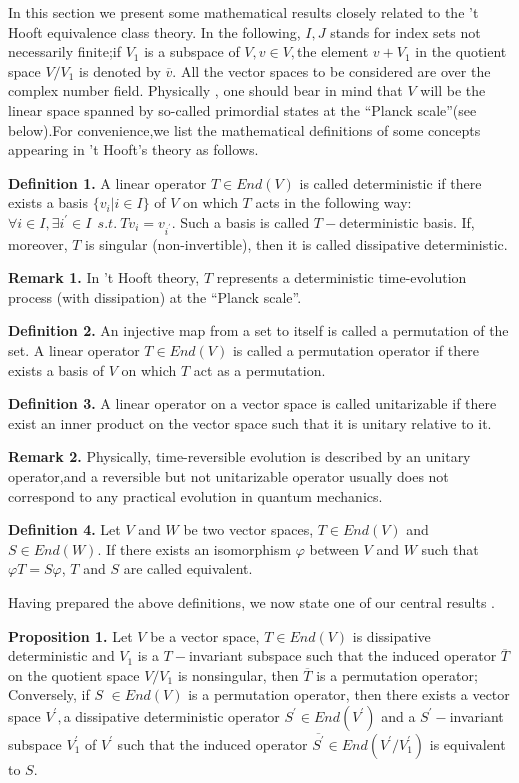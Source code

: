 \documentclass[a4paper,12pt]{article}
\begin{document}
In this section we present some mathematical results closely related to the
't Hooft equivalence class theory. In the following, $I,J$ stands for index
sets not necessarily finite;if $V_1$ is a subspace of $V,v\in V,$the element
$v+V_1$ in the quotient space $V/V_1$ is denoted by $\overline{v}.$ All the
vector spaces to be considered are over the complex number field. Physically
, one should bear in mind that $V$ will be the linear space spanned by
so-called primordial states at the ``Planck scale''(see below).For
convenience,we list the mathematical definitions of some concepts appearing
in 't Hooft's theory as follows.

\textbf{Definition 1.} A linear operator $T\in End(V)$ is called
deterministic if there exists a basis $\{v_i|i\in I\}$ of $V$ on which $T$
acts in the following way:$\forall i\in I,\exists i^{\prime }\in I\ \ s.t.\
Tv_i=v_{i^{\prime }}.$ Such a basis is called $T-$deterministic basis. If,
moreover, $T$ is singular (non-invertible), then it is called dissipative
deterministic.

\textbf{Remark 1.} In 't Hooft theory, $T$ represents a deterministic
time-evolution process (with dissipation) at the ``Planck scale''.

\textbf{Definition 2.} An injective map from a set to itself is called a
permutation of the set. A linear operator $T\in End(V)$ is called a
permutation operator if there exists a basis of $V$ on which $T$ act as a
permutation.

\textbf{Definition 3.} A linear operator on a vector space is called
unitarizable if there exist an inner product on the vector space such that
it is unitary relative to it.

\textbf{Remark 2.} Physically, time-reversible evolution is described by an
unitary operator,and a reversible but not unitarizable operator usually does
not correspond to any practical evolution in quantum mechanics.

\textbf{Definition 4.} Let $V$ and $W$ be two vector spaces, $T\in End(V)$
and $S\in End(W)$. If there exists an isomorphism $\varphi $ between $V$ and
$W$ such that $\varphi T=S\varphi $, $T$ and $S$ are called equivalent.

Having prepared the above definitions, we now state one of our central
results .

\textbf{Proposition 1.} Let $V$ be a vector space, $T\in End(V)$ is
dissipative deterministic and $V_1$ is a $T-$invariant subspace such that
the induced operator $\overline{T} $ on the quotient space $V/V_1$ is
nonsingular, then $\overline{T}$ is a permutation operator; Conversely, if $%
S $ $\in End(V)$ is a permutation operator, then there exists a vector space
$V^{\prime },$a dissipative deterministic operator $S^{\prime }\in
End(V^{\prime })$ and a $S^{\prime }-$invariant subspace $V_1^{\prime }$ of $%
V^{\prime }$ such that the induced operator $\overline{S^{\prime }}\in
End(V^{\prime }/V_1^{\prime })$ is equivalent to $S.$
\end{document}
